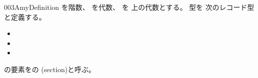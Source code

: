 \documentclass[index]{subfiles}
\begin{document}
\begin{myBlock}{003A}{myDefinition}
  を階数、
  を\myInlineMath{\myNat}代数、
  を
  上の\myInlineMath{\myNat}代数とする。
  型を
  次のレコード型と定義する。
  \begin{itemize}
  \item {}
  \item {}
  \item {}
  \end{itemize}
  の要素をの
  (section)と呼ぶ。
\end{myBlock}
\end{document}
